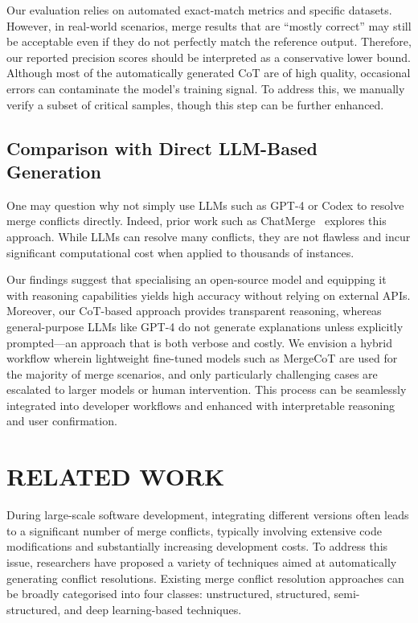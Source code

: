 \documentclass[sigconf,review,anonymous]{acmart}
\begin{document}
Our evaluation relies on automated exact-match metrics and specific datasets. However, in real-world scenarios, merge results that are “mostly correct” may still be acceptable even if they do not perfectly match the reference output. Therefore, our reported precision scores should be interpreted as a conservative lower bound.
Although most of the automatically generated CoT are of high quality, occasional errors can contaminate the model's training signal. To address this, we manually verify a subset of critical samples, though this step can be further enhanced.

\subsection{Comparison with Direct LLM-Based Generation}

One may question why not simply use LLMs such as GPT-4 or Codex to resolve merge conflicts directly. Indeed, prior work such as ChatMerge~\cite{17} explores this approach. While LLMs can resolve many conflicts, they are not flawless and incur significant computational cost when applied to thousands of instances.

Our findings suggest that specialising an open-source model and equipping it with reasoning capabilities yields high accuracy without relying on external APIs. Moreover, our CoT-based approach provides transparent reasoning, whereas general-purpose LLMs like GPT-4 do not generate explanations unless explicitly prompted—an approach that is both verbose and costly.
We envision a hybrid workflow wherein lightweight fine-tuned models such as MergeCoT are used for the majority of merge scenarios, and only particularly challenging cases are escalated to larger models or human intervention. This process can be seamlessly integrated into developer workflows and enhanced with interpretable reasoning and user confirmation.

\section{RELATED WORK}
During large-scale software development, integrating different versions often leads to a significant number of merge conflicts, typically involving extensive code modifications and substantially increasing development costs. To address this issue, researchers have proposed a variety of techniques aimed at automatically generating conflict resolutions. Existing merge conflict resolution approaches can be broadly categorised into four classes: unstructured, structured, semi-structured, and deep learning-based techniques.
\end{document}
